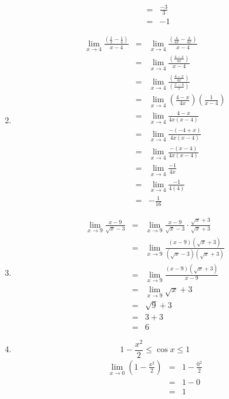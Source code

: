 \documentclass{article}
\begin{document}
\begin{enumerate}
\begin{eqnarray}
    	    &=& \frac{-3}{3} \\
    	    &=& -1
    	\end{eqnarray}
    \item
    	\begin{eqnarray}
    	    \lim_{x \to 4}{\frac{\left ( \frac{1}{x} - \frac{1}{4} \right )}{x - 4}} &=& \lim_{x \to 4}{\frac{\left ( \frac{4}{4x} - \frac{x}{4x} \right )}{x - 4}} \\
    	    &=& \lim_{x \to 4}{\frac{\left ( \frac{4 - x}{4x} \right )}{x - 4}} \\
    	    &=& \lim_{x \to 4}{\frac{\left ( \frac{4 - x}{4x} \right )}{\left ( \frac{x - 4}{1} \right )}} \\
    	    &=& \lim_{x \to 4}{ \left (\frac{4 - x}{4x} \right ) \left (\frac{1}{x-4} \right )} \\
    	    &=& \lim_{x \to 4}{\frac{4 - x}{4x(x - 4)}} \\
    	    &=& \lim_{x \to 4}{\frac{-(-4 + x)}{4x(x - 4)}} \\
    	    &=& \lim_{x \to 4}{\frac{-(x - 4)}{4x(x - 4)}} \\
    	    &=& \lim_{x \to 4}{\frac{-1}{4x}} \\
    	    &=& \lim_{x \to 4}{\frac{-1}{4(4)}} \\
    	    &=& -\frac{1}{16}
    	\end{eqnarray}
    \item
    	\begin{eqnarray}
    	    \lim_{x \to 9}{\frac{x - 9}{\sqrt{x} - 3}} &=& \lim_{x \to 9}{\frac{x - 9}{\sqrt{x} - 3} \cdot \frac{\sqrt{x} + 3}{\sqrt{x} + 3}} \\
    	    &=& \lim_{x \to 9}{\frac{(x - 9)(\sqrt{x} + 3)}{(\sqrt{x} - 3)(\sqrt{x} + 3)}} \\
    	    &=& \lim_{x \to 9}{\frac{(x - 9)(\sqrt{x} + 3)}{x - 9}} \\
    	    &=& \lim_{x \to 9}{\sqrt{x} + 3} \\
    	    &=& \sqrt{9} + 3 \\
    	    &=& 3 + 3\\
    	    &=& 6
    	\end{eqnarray}
    \item
    	$$1 - \frac{x^2}{2} \leq \cos{x} \leq 1$$
    	\begin{eqnarray}
    	    \lim_{x \to 0}{\left ( 1 - \frac{x^2}{2} \right )} &=& 1 - \frac{0^2}{2} \\
    	    &=& 1 - 0 \\
    	    &=& 1 \\

\end{eqnarray}
\end{enumerate}
\end{document}

